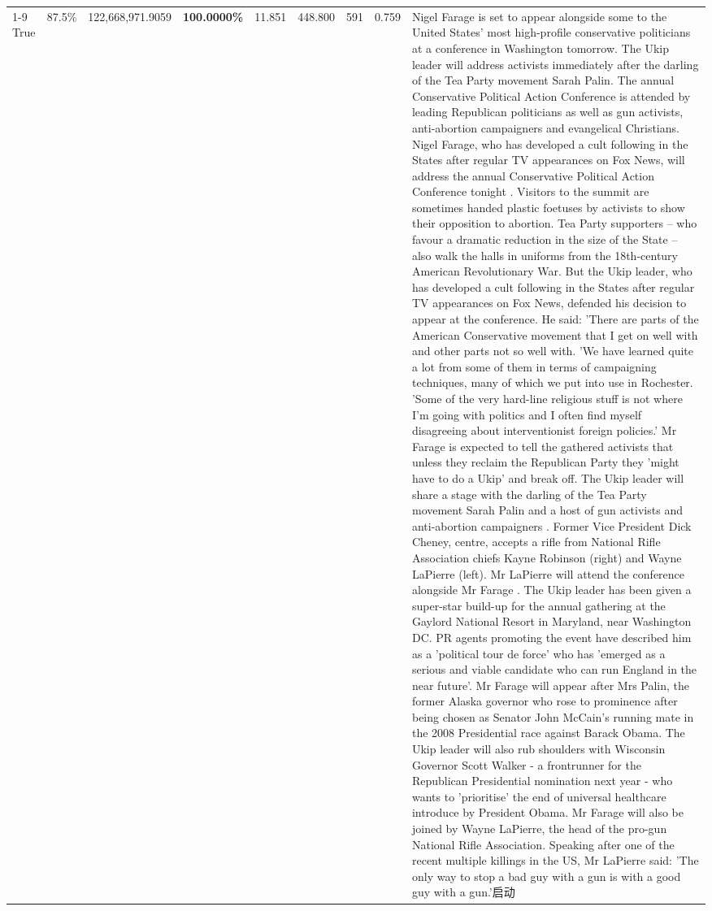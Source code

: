 \begin{table}[H]
\begin{tabular}{lllrlllll}
\cline{1-9}
True & 87.5\% & 122,668,971.9059 & \bfseries \color{red} 100.0000\% & 11.851 & 448.800 & 591 & 0.759 & Nigel Farage is set to appear alongside some to the United States' most high-profile conservative politicians at a conference in Washington tomorrow. The Ukip leader will address activists immediately after the darling of the Tea Party movement Sarah Palin. The annual Conservative Political Action Conference is attended by leading Republican politicians as well as gun activists, anti-abortion campaigners and evangelical Christians. Nigel Farage, who has developed a cult following in the States after regular TV appearances on Fox News, will address the annual Conservative Political Action Conference tonight . Visitors to the summit are sometimes handed plastic foetuses by activists to show their opposition to abortion. Tea Party supporters – who favour a dramatic reduction in the size of the State – also walk the halls in uniforms from the 18th-century American Revolutionary War. But the Ukip leader, who has developed a cult following in the States after regular TV appearances on Fox News, defended his decision to appear at the conference. He said: 'There are parts of the American Conservative movement that I get on well with and other parts not so well with. 'We have learned quite a lot from some of them in terms of campaigning techniques, many of which we put into use in Rochester. 'Some of the very hard-line religious stuff is not where I'm going with politics and I often find myself disagreeing about interventionist foreign policies.' Mr Farage is expected to tell the gathered activists that unless they reclaim the Republican Party they 'might have to do a Ukip' and break off. The Ukip leader will share a stage with the darling of the Tea Party movement Sarah Palin and a host of gun activists and anti-abortion campaigners . Former Vice President Dick Cheney, centre, accepts a rifle from National Rifle Association chiefs Kayne Robinson (right) and Wayne LaPierre (left). Mr LaPierre will attend the conference alongside Mr Farage . The Ukip leader has been given a super-star build-up for the annual gathering at the Gaylord National Resort in Maryland, near Washington DC. PR agents promoting the event have described him as a 'political tour de force' who has 'emerged as a serious and viable candidate who can run England in the near future'. Mr Farage will appear after Mrs Palin, the former Alaska governor who rose to prominence after being chosen as Senator John McCain's running mate in the 2008 Presidential race against Barack Obama. The Ukip leader will also rub shoulders with Wisconsin Governor Scott Walker - a frontrunner for the Republican Presidential nomination next year - who wants to 'prioritise' the end of universal healthcare introduce by President Obama. Mr Farage will also be joined by Wayne LaPierre, the head of the pro-gun National Rifle Association. Speaking after one of the recent multiple killings in the US, Mr LaPierre said: 'The only way to stop a bad guy with a gun is with a good guy with a gun.'启动 \\

\end{tabular}
\end{table}
